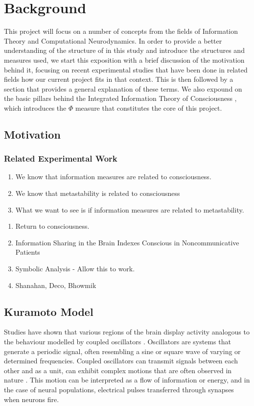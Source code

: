 \documentclass[a4paper,11pt]{article}
\begin{document}
\section{Background}
\label{sec:bg}
This project will focus on a number of concepts from the fields of Information Theory and Computational Neurodynamics. In order to provide a better understanding of the structure of in this study and introduce the structures and measures used, we start this exposition with a brief discussion of the motivation behind it, focusing on recent experimental studies that have been done in related fields how our current project fits in that context. This is then followed by a section that provides a general explanation of these terms. We also expound on the basic pillars behind the Integrated Information Theory of Consciousness \cite{Tononi2008a}, which introduces the $\Phi$ measure that constitutes the core of this project.

\subsection{Motivation}

\subsubsection{Related Experimental Work}
\begin{enumerate}
\item{We know that information measures are related to consciousness.}
\item{We know that metastability is related to consciousness}
\item{What we want to see is if information measures are related to metastability.}
\end{enumerate}

\begin{enumerate}
\item{Return to consciousness.}
\item{Information Sharing in the Brain Indexes Conscious in Noncommunicative Patients}
\item{Symbolic Analysis - Allow this to work.}
\item{Shanahan, Deco, Bhowmik}
\end{enumerate}

\subsection{Kuramoto Model}
\label{KuramotoModel}
Studies have shown that various regions of the brain display activity analogous to the behaviour modelled by coupled oscillators \cite{Bennett2004}. Oscillators are systems that generate a periodic signal, often resembling a sine or square wave \cite{Westra1999} of varying or determined frequencies. Coupled oscillators can transmit signals between each other and as a unit, can exhibit complex motions that are often observed in nature \cite{Wolfs2004}. This motion can be interpreted as a flow of information or energy, and in the case of neural populations, electrical pulses transferred through synapses when neurons fire.
\end{document}
